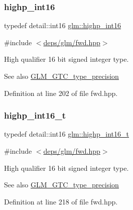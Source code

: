 \subsubsection{\texorpdfstring{highp\+\_\+int16}{highp\_int16}}
{\footnotesize\ttfamily typedef detail\+::int16 \hyperlink{group__gtc__type__precision_gaf0430ed80e88c0d1dfbe47f359659c81}{glm\+::highp\+\_\+int16}}



{\ttfamily \#include $<$\hyperlink{fwd_8hpp}{deps/glm/fwd.\+hpp}$>$}

High qualifier 16 bit signed integer type. \begin{DoxySeeAlso}{See also}
\hyperlink{group__gtc__type__precision}{G\+L\+M\+\_\+\+G\+T\+C\+\_\+type\+\_\+precision} 
\end{DoxySeeAlso}


Definition at line 202 of file fwd.\+hpp.

\mbox{\label{group__gtc__type__precision_ga07d318d61472e75238e53b9642227672}} 
\subsubsection{\texorpdfstring{highp\+\_\+int16\+\_\+t}{highp\_int16\_t}}
{\footnotesize\ttfamily typedef detail\+::int16 \hyperlink{group__gtc__type__precision_ga07d318d61472e75238e53b9642227672}{glm\+::highp\+\_\+int16\+\_\+t}}



{\ttfamily \#include $<$\hyperlink{fwd_8hpp}{deps/glm/fwd.\+hpp}$>$}

High qualifier 16 bit signed integer type. \begin{DoxySeeAlso}{See also}
\hyperlink{group__gtc__type__precision}{G\+L\+M\+\_\+\+G\+T\+C\+\_\+type\+\_\+precision} 
\end{DoxySeeAlso}


Definition at line 218 of file fwd.\+hpp.

\mbox{\label{group__gtc__type__precision_gaa2045c92b9553d463191af6a20e997bb}} 
